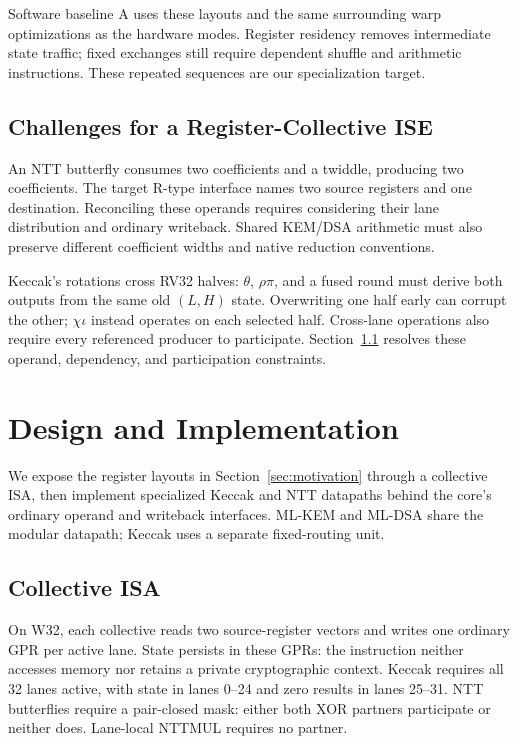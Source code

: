 \documentclass[conference,letterpaper]{IEEEtran}
\begin{document}
Software baseline A uses these layouts and the same surrounding warp optimizations
as the hardware modes. Register residency removes intermediate state traffic;
fixed exchanges still require dependent shuffle and arithmetic instructions.
These repeated sequences are our specialization target.

\subsection{Challenges for a Register-Collective ISE}
An NTT butterfly consumes two coefficients and a twiddle, producing two
coefficients. The target R-type interface names two source registers and one
destination. Reconciling these operands requires considering their lane
distribution and ordinary writeback. Shared KEM/DSA arithmetic must also
preserve different coefficient widths and native reduction conventions.

Keccak's rotations cross RV32 halves: $\theta$, $\rho\pi$, and a fused
round must derive both outputs from the same old $(L,H)$ state.
Overwriting one half early can corrupt the other; $\chi\iota$ instead
operates on each selected half. Cross-lane operations also require every
referenced producer to participate. Section~\ref{sec:isa} resolves these
operand, dependency, and participation constraints.

\section{Design and Implementation}
\label{sec:design}
We expose the register layouts in Section~\ref{sec:motivation} through a
collective ISA, then implement specialized Keccak and NTT datapaths behind
the core's ordinary operand and writeback interfaces. ML-KEM and ML-DSA share
the modular datapath; Keccak uses a separate fixed-routing unit.

\subsection{Collective ISA}
\label{sec:isa}
On W32, each collective reads two source-register vectors and writes one
ordinary GPR per active lane. State persists in these GPRs: the instruction
neither accesses memory nor retains a private cryptographic context. Keccak
requires all 32 lanes active, with state in lanes 0--24 and zero results in
lanes 25--31. NTT butterflies require a pair-closed mask: either both XOR
partners participate or neither does. Lane-local NTTMUL requires no partner.
\end{document}
